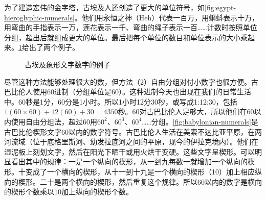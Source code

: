 \documentclass[b5paper]{ctexart}
\begin{document}
为了建造宏伟的金字塔，古埃及人还创造了更大的单位符号，如\cref{fig:egypt-hieroglyphic-numerals}。他们用永恒之神（Heh）代表一百万，用蝌蚪表示十万，用弯曲的手指表示一万，莲花表示一千、弯曲的绳子表示一百……计数时按照单位分组，超出后就组成更大的单位。最后把每个单位的数目和单位表示的大小乘起来。\cref{fig:egypt-number-examples}给出了两个例子。

\begin{figure}[htbp]
 \centering
 \caption{古埃及象形文字数字的例子}
 \label{fig:egypt-number-examples}
\end{figure}

尽管这种方法能够处理很大的数，但方法（2）自由分组对付小数字也很方便。古巴比伦人使用60进制（分组单位是60）。这种进制今天也出现在我们的日常生活中。60秒是1分，60分是1小时。所以1小时12分30秒，或写成1:12:30，包括$1(60\times 60) + 12(60) + 30 = 4350$秒。60对古巴比伦人足够大，所以他们在60以内使用自由分组法，超过60用$60^2$、$60^3$、$60^4$……分组。\cref{fig:babylonian-numerals}是古巴比伦楔形文字60以内的数字符号。古巴比伦人生活在美索不达比亚平原，在两河流域（位于底格里斯河、幼发拉底河之间的平原，现今的伊拉克境内）。他们在湿泥板上刻划文字，然后在阳光下晒干或用火烘干变硬。这些文字呈楔形。可以明显看出其中的规律：一是一个纵向的楔形，从一到九每数一就增加一个纵向的楔形。十变成了一个横向的楔形，从十一到十九是一个横向的楔形（10）加上相应纵向的楔形。二十是两个横向的楔形，然后重复这个规律。所以60以内的数字是横向的楔形个数乘以10加上纵向的楔形个数。
\end{document}
